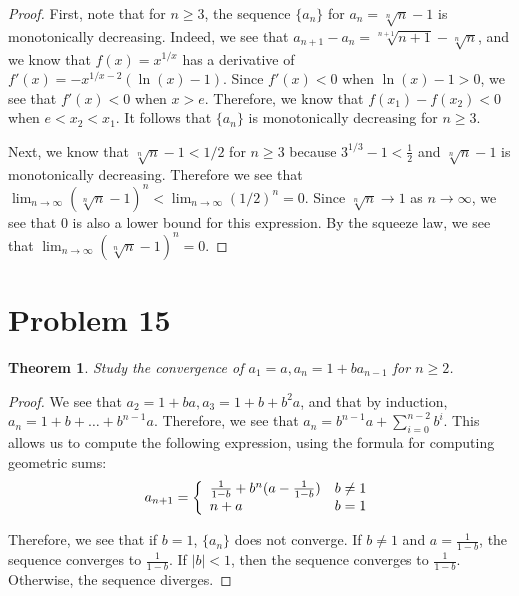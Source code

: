 \documentclass[psamsfonts]{amsart}
\newtheorem{thm}{Theorem}[section]
\theoremstyle{definition}
\theoremstyle{remark}
\numberwithin{equation}{section}
\begin{document}
\begin{proof}
First, note that for $n \geq 3$, the sequence $\{ a_n \}$ for $ a_n = \sqrt[n]{n} - 1$ is monotonically decreasing. Indeed, we see that $a_{n+1} - a_n = \sqrt[n+1]{n+1} - \sqrt[n]{n}$, and we know that $f(x) = x^{1/x}$ has a derivative of $f'(x) = -x^{1/x-2}( \ln(x) - 1)$. Since $f'(x) < 0$ when $\ln(x) - 1 > 0$, we see that $f'(x)<0$ when $x > e$. Therefore, we know that $f(x_1) - f(x_2) < 0$ when $e < x_2 < x_1$. It follows that $\{ a_n \}$ is monotonically decreasing for $n \geq 3$. 

Next, we know that $\sqrt[n]{n} - 1 < 1/2$ for $n \geq 3$ because $3^{1/3} - 1 < \frac{1}{2}$ and $\sqrt[n]{n} - 1$ is monotonically decreasing. Therefore we see that $\lim_{n \to \infty} (\sqrt[n]{n} - 1)^n < \lim_{n \to \infty} (1/2)^n = 0$. Since $\sqrt[n]{n} \to 1$ as $ n \to \infty$, we see that 0 is also a lower bound for this expression. By the squeeze law, we see that $\lim_{n \to \infty} (\sqrt[n]{n} - 1)^n = 0$. 
\end{proof}

\section{Problem 15}

\begin{thm}
Study the convergence of $a_1 = a, a_n = 1 + b a_{n-1}$ for $n \geq 2$. 
\end{thm}

\begin{proof}
We see that $a_2 = 1 + ba, a_3 = 1 + b + b^2 a$, and that by induction, $a_n = 1 + b + \ldots + b^{n-1} a$. Therefore, we see that $a_n = b^{n-1} a + \sum_{i = 0}^{n-2} b^i$. This allows us to compute the following expression, using the formula for computing geometric sums:
\begin{eqnarray}
a_{n+1} = \left\{ \begin{array}{l l}
\frac{1}{1-b} + b^n ( a - \frac{1}{1-b}) & b \neq 1 \\
n+a & b = 1 \end{array} \right.
\end{eqnarray}

Therefore, we see that if $b = 1$, $\{ a_n \}$ does not converge. If $ b \neq 1$ and $a = \frac{1}{1-b}$, the sequence converges to $\frac{1}{1-b}$. If $|b| < 1$, then the sequence converges to $\frac{1}{1-b}$. Otherwise, the sequence diverges.
\end{proof}
\end{document}
